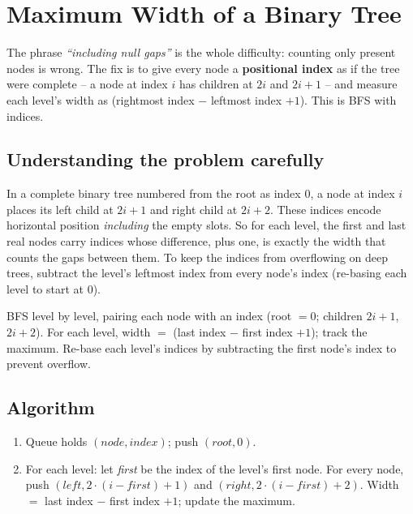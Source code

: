 \section{Maximum Width of a Binary Tree}
\label{sec:trees-max-width}


\begin{patternbox}
The phrase \emph{``including null gaps''} is the whole difficulty:
counting only present nodes is wrong. The fix is to give every node a
\textbf{positional index} as if the tree were complete -- a node at index
$i$ has children at $2i$ and $2i+1$ -- and measure each level's width as
(rightmost index $-$ leftmost index $+1$). This is BFS with indices.
\end{patternbox}

\subsection*{Understanding the problem carefully}

In a complete binary tree numbered from the root as index $0$, a node at
index $i$ places its left child at $2i+1$ and right child at $2i+2$. These
indices encode horizontal position \emph{including} the empty slots. So for
each level, the first and last real nodes carry indices whose difference,
plus one, is exactly the width that counts the gaps between them. To keep
the indices from overflowing on deep trees, subtract the level's leftmost
index from every node's index (re-basing each level to start at $0$).

\begin{ideabox}
BFS level by level, pairing each node with an index (root $=0$; children
$2i+1$, $2i+2$). For each level, width $=$ (last index $-$ first index
$+1$); track the maximum. Re-base each level's indices by subtracting the
first node's index to prevent overflow.
\end{ideabox}

\subsection*{Algorithm}

\begin{enumerate}
  \item Queue holds $(node, index)$; push $(root, 0)$.
  \item For each level: let \textit{first} be the index of the level's
        first node. For every node, push $(left, 2\cdot(i-\textit{first})+1)$
        and $(right, 2\cdot(i-\textit{first})+2)$. Width $=$ last index
        $-$ first index $+1$; update the maximum.
\end{enumerate}

